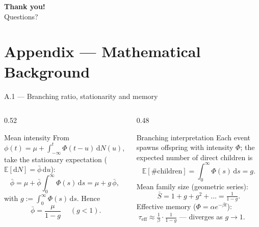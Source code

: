 \documentclass[aspectratio=169]{beamer}
\begin{document}
\begin{frame}[plain]
  \centering
  \vspace{2cm}
  {\Huge \textbf{Thank you!}}\\[1cm]
  {\large Questions?}
\end{frame}

\appendix

\section{Appendix — Mathematical Background}

\begin{frame}{A.1 — Branching ratio, stationarity and memory}
  \begin{columns}[T]
    \begin{column}{0.52\textwidth}
      \begin{block}{Mean intensity}
        From $\phi(t)=\mu+\int_{-\infty}^t\Phi(t-u)\,\mathrm{d}N(u)$, take the stationary expectation ($\mathbb{E}[\mathrm{d}N]=\bar\phi\,\mathrm{d}u$):
        \[
          \bar\phi=\mu+\bar\phi\!\int_0^\infty\!\Phi(s)\,\mathrm{d}s=\mu+g\,\bar\phi,
        \]
        with $g:=\int_0^\infty\Phi(s)\,\mathrm{d}s$. Hence
        \[
          \boxed{\;\bar\phi=\frac{\mu}{1-g}\;}\quad(g<1).
        \]
      \end{block}
    \end{column}
    \begin{column}{0.48\textwidth}
      \begin{block}{Branching interpretation}
        \footnotesize
        Each event spawns offspring with intensity $\Phi$; the expected number of direct children is
        \[ \mathbb{E}[\#\text{children}]=\int_0^\infty\Phi(s)\,\mathrm{d}s=g. \]
        Mean family size (geometric series):
        \[ \bar S=1+g+g^2+\dots=\tfrac{1}{1-g}. \]
        Effective memory ($\Phi=\alpha e^{-\beta t}$): $\;\tau_{\text{eff}}\approx \tfrac{1}{\beta}\cdot\tfrac{1}{1-g}$ — diverges as $g\to1$.
      \end{block}
    \end{column}
  \end{columns}
\end{frame}
\end{document}
